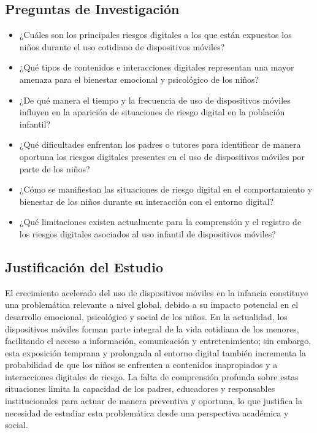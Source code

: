 \subsection{Preguntas de Investigación}

\begin{itemize}
   \item ¿Cuáles son los principales riesgos digitales a los que están expuestos los niños durante el uso cotidiano de dispositivos móviles?
    
    \item ¿Qué tipos de contenidos e interacciones digitales representan una mayor amenaza para el bienestar emocional y psicológico de los niños?
    
    \item ¿De qué manera el tiempo y la frecuencia de uso de dispositivos móviles influyen en la aparición de situaciones de riesgo digital en la población infantil?
    
    \item ¿Qué dificultades enfrentan los padres o tutores para identificar de manera oportuna los riesgos digitales presentes en el uso de dispositivos móviles por parte de los niños?
    
    \item ¿Cómo se manifiestan las situaciones de riesgo digital en el comportamiento y bienestar de los niños durante su interacción con el entorno digital?
    
    \item ¿Qué limitaciones existen actualmente para la comprensión y el registro de los riesgos digitales asociados al uso infantil de dispositivos móviles?
\end{itemize}

\subsection{Justificación del Estudio}
El crecimiento acelerado del uso de dispositivos móviles en la infancia constituye una problemática relevante a nivel global, debido a su impacto potencial en el desarrollo emocional, psicológico y social de los niños. En la actualidad, los dispositivos móviles forman parte integral de la vida cotidiana de los menores, facilitando el acceso a información, comunicación y entretenimiento; sin embargo, esta exposición temprana y prolongada al entorno digital también incrementa la probabilidad de que los niños se enfrenten a contenidos inapropiados y a interacciones digitales de riesgo. La falta de comprensión profunda sobre estas situaciones limita la capacidad de los padres, educadores y responsables institucionales para actuar de manera preventiva y oportuna, lo que justifica la necesidad de estudiar esta problemática desde una perspectiva académica y social.

